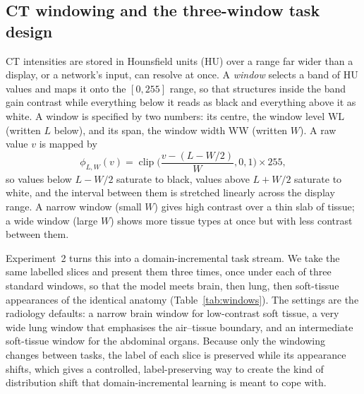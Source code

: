 \documentclass[11pt]{article}
\begin{document}
\subsection{CT windowing and the three-window task design}\label{sec:windowing}
CT intensities are stored in Hounsfield units (HU) over a range far wider than a
display, or a network's input, can resolve at once. A \emph{window} selects a band
of HU values and maps it onto the $[0,255]$ range, so that structures inside the
band gain contrast while everything below it reads as black and everything above
it as white. A window is specified by two numbers: its centre, the window level
$\mathrm{WL}$ (written $L$ below), and its span, the window width $\mathrm{WW}$
(written $W$). A raw value $v$ is mapped by
\begin{equation}
\phi_{L,W}(v)=\operatorname{clip}\!\Big(
\frac{v-(L-W/2)}{W}, 0, 1\Big)\times 255 ,
\label{eq:window}
\end{equation}
so values below $L-W/2$ saturate to black, values above $L+W/2$ saturate to
white, and the interval between them is stretched linearly across the display
range. A narrow window (small $W$) gives high contrast over a thin slab of
tissue; a wide window (large $W$) shows more tissue types at once but with less
contrast between them.

Experiment~2 turns this into a domain-incremental task stream. We take the same
labelled slices and present them three times, once under each of three standard
windows, so that the model meets brain, then lung, then soft-tissue appearances
of the identical anatomy (Table~\ref{tab:windows}). The settings are the
radiology defaults: a narrow brain window for low-contrast soft tissue, a very
wide lung window that emphasises the air--tissue boundary, and an intermediate
soft-tissue window for the abdominal organs. Because only the windowing changes
between tasks, the label of each slice is preserved while its appearance shifts,
which gives a controlled, label-preserving way to create the kind of distribution
shift that domain-incremental learning is meant to cope with.
\end{document}
